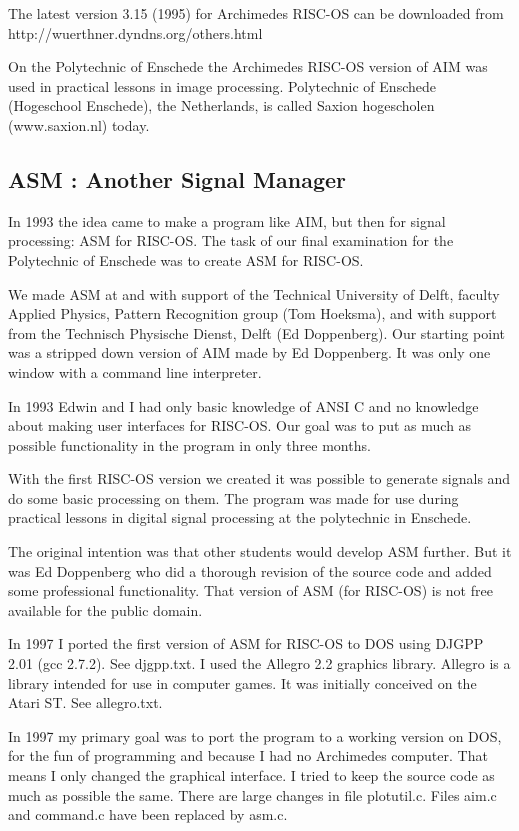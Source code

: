 \documentclass{report}
\begin{document}
The latest version 3.15 (1995) for Archimedes RISC-OS can be downloaded
from http://wuerthner.dyndns.org/others.html

On the Polytechnic of Enschede the Archimedes RISC-OS version of AIM was used
in practical lessons in image processing.  Polytechnic of Enschede (Hogeschool
Enschede), the Netherlands, is called Saxion hogescholen (www.saxion.nl)
today.


\subsection{ASM : Another Signal Manager}

In 1993 the idea came to make a program like AIM, but then for signal
processing: ASM for RISC-OS.  The task of our final examination for the
Polytechnic of Enschede was to create ASM for RISC-OS.

We made ASM at and with support of the Technical University of Delft, faculty
Applied Physics, Pattern Recognition group (Tom Hoeksma), and with support from
the Technisch Physische Dienst, Delft (Ed Doppenberg).  Our starting point was
a stripped down version of AIM made by Ed Doppenberg.  It was only one window
with a command line interpreter. 

In 1993 Edwin and I had only basic knowledge of ANSI C and no knowledge about
making user interfaces for RISC-OS. Our goal was to put as much as possible
functionality in the program in only three months.

With the first RISC-OS version we created it was possible to generate signals
and do some basic processing on them. The program was made for use during
practical lessons in digital signal processing at the polytechnic in Enschede.

The original intention was that other students would develop ASM further. But
it was Ed Doppenberg who did a thorough revision of the source code and added
some professional functionality. That version of ASM (for RISC-OS) is not free
available for the public domain.

In 1997 I ported the first version of ASM for RISC-OS to DOS using DJGPP 2.01
(gcc 2.7.2). See djgpp.txt. I used the Allegro 2.2 graphics library.
Allegro is a library intended for use in computer games. It was initially
conceived on the Atari ST. See allegro.txt.

In 1997 my primary goal was to port the program to a working version on DOS, for
the fun of programming and because I had no Archimedes computer.  That means I
only changed the graphical interface. I tried to keep the source code as much
as possible the same.  There are large changes in file plotutil.c. Files aim.c
and command.c have been replaced by asm.c.
\end{document}
